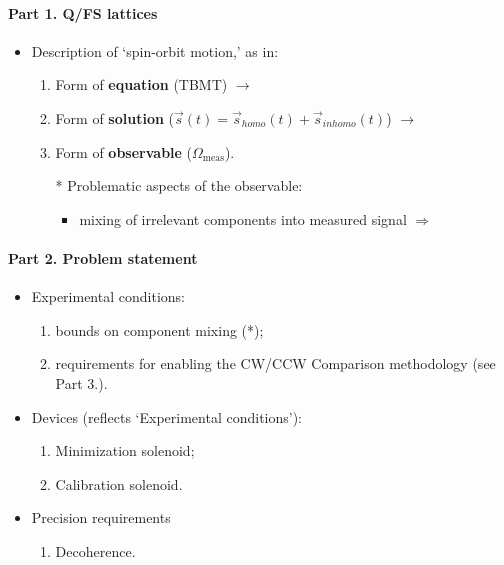 \documentclass{article}
\begin{document}
\paragraph{Part 1. Q/FS lattices}
\begin{itemize}
	\item Description of `spin-orbit motion,' as in:
	\begin{enumerate}
		\item Form of \textbf{equation} (TBMT) $\rightarrow$
		\item Form of \textbf{solution} ($\vec{s}(t) = \vec{s}_{homo}(t) + \vec{s}_{inhomo}(t)$) $\rightarrow$
		\item Form of \textbf{observable} ($\Omega_{\text{meas}}$).
		\item[*] Problematic aspects of the observable:
		\begin{itemize}
			\item mixing of irrelevant components into measured signal $\Rightarrow$ 
		\end{itemize}
	\end{enumerate}
\end{itemize}

\paragraph{Part 2. Problem statement}
\begin{itemize}
	\item Experimental conditions:
	\begin{enumerate}
		\item bounds on component mixing (*);
		\item requirements for enabling the CW/CCW Comparison methodology (see Part 3.).
	\end{enumerate}
	\item Devices (reflects `Experimental conditions'):
	\begin{enumerate}
		\item Minimization solenoid;
		\item Calibration solenoid.
	\end{enumerate}
	\item Precision requirements
	\begin{enumerate}
		\item Decoherence.
	\end{enumerate}
\end{itemize}
\end{document}
